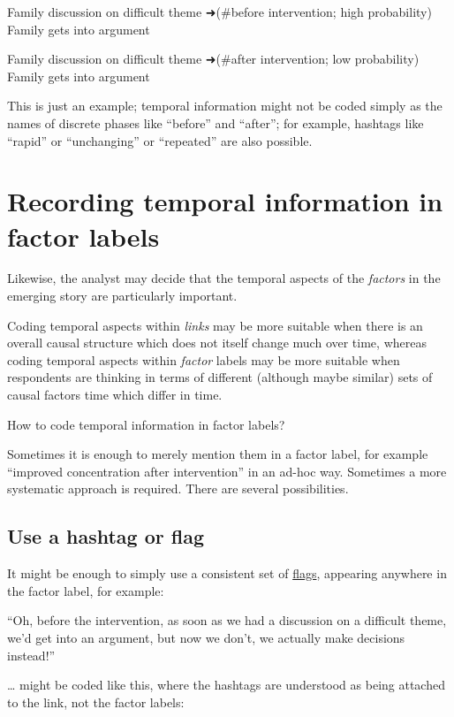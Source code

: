 \documentclass[
]{book}
\begin{document}
Family discussion on difficult theme ➜(\#before intervention; high probability) Family gets into argument

Family discussion on difficult theme ➜(\#after intervention; low probability) Family gets into argument

This is just an example; temporal information might not be coded simply as the names of discrete phases like ``before'' and ``after''; for example, hashtags like ``rapid'' or ``unchanging'' or ``repeated'' are also possible.

\hypertarget{recording-temporal-information-in-factor-labels}{%
\section{Recording temporal information in factor labels}\label{recording-temporal-information-in-factor-labels}}

Likewise, the analyst may decide that the temporal aspects of the \emph{factors} in the emerging story are particularly important.

Coding temporal aspects within \emph{links} may be more suitable when there is an overall causal structure which does not itself change much over time, whereas coding temporal aspects within \emph{factor} labels may be more suitable when respondents are thinking in terms of different (although maybe similar) sets of causal factors time which differ in time.

How to code temporal information in factor labels?

Sometimes it is enough to merely mention them in a factor label, for example ``improved concentration after intervention'' in an ad-hoc way. Sometimes a more systematic approach is required. There are several possibilities.

\hypertarget{use-a-hashtag-or-flag}{%
\subsection{Use a hashtag or flag}\label{use-a-hashtag-or-flag}}

It might be enough to simply use a consistent set of \href{https://causalmapdocumentation.blot.im/search?q=flag}{flags}, appearing anywhere in the factor label, for example:

``Oh, before the intervention, as soon as we had a discussion on a difficult theme, we'd get into an argument, but now we don't, we actually make decisions instead!''

\ldots{} might be coded like this, where the hashtags are understood as being attached to the link, not the factor labels:
\end{document}
